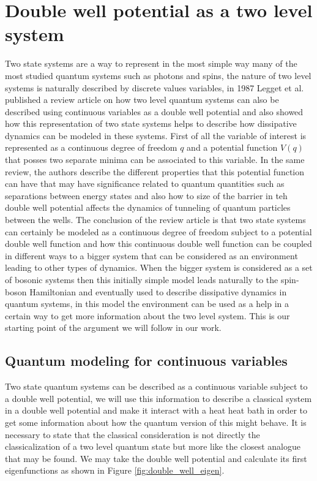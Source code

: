 \section{Double well potential as a two level system}
Two state systems are a way to represent in the most simple way many of the most studied quantum systems such as photons and spins, the nature of two level systems is naturally described by discrete values variables, in 1987 Legget et al. \cite{leggett1987dynamics} published a review article on how two level quantum systems can also be described using continuous variables as a double well potential and also showed how this representation of two state systems helps to describe how dissipative dynamics can be modeled in these systems. First of all the variable of interest is represented as a continuous degree of freedom $q$ and a potential function $V(q)$ that posses two separate minima can be associated to this variable. In the same review, the authors describe the different properties that this potential function can have that may have significance related to quantum quantities such as separations between energy states and also how to size of the barrier in teh double well potential affects the dynamics of tunneling of quantum particles between the wells. The conclusion of the review article is that two state systems can certainly be modeled as a continuous degree of freedom subject to a potential double well function and how this continuous double well function can be coupled in different ways to a bigger system that can be considered as an environment leading to other types of dynamics. When the bigger system is considered as a set of bosonic systems then this initially simple model leads naturally to the spin-boson Hamiltonian and eventually used to describe dissipative dynamics in quantum systems, in this model the environment can be used as a help in a certain way to get more information about the two level system. This is our starting point of the argument we will follow in our work.\par 

\subsection{Quantum modeling for continuous variables}
Two state quantum systems can be described as a continuous variable subject to a double well potential, we will use this information to describe a classical system in a double well potential and make it interact with a heat  heat bath in order to get some information about how the quantum version of this might behave. It is necessary to state that the classical consideration is not directly the classicalization of a two level quantum state but more like the closest analogue that may be found. We may take the double well potential and calculate its first eigenfunctions as shown in Figure \ref{fig:double_well_eigen}. 

